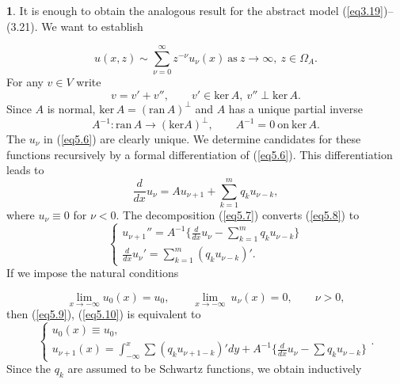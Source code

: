 \documentclass{surv-l}
\theoremstyle{plain}
\theoremstyle{definition}
\newtheorem*{pf}{\sc{Proof}}
\numberwithin{equation}{chapter}
\begin{document}
\begin{pf}
It is enough to obtain the analogous result for the abstract model (\ref{eq3.19})--(3.21). We want to establish

\begin{equation}\label{eq5.6}
u(x,z)\sim\sum_{\nu=0}^{\infty}z^{-\nu}u_{\nu}(x)\ \mathrm{as}\  z\rightarrow\infty,\ z\in\Omega_{A}.
\end{equation}
For any $v\in V$ write
\begin{equation}\label{eq5.7}
v=v'+v'',\qquad v'\in \mathrm{ker}\,A,\ v''\perp \mathrm{ker}\,A.
\end{equation}
Since $A$ is normal, $\mathrm{ker}\,A= (\mathrm{ran}\,A)^{\perp}$ and $A$ has a unique partial inverse
\begin{equation*}
A^{-1} : \mathrm{ran}\, A\rightarrow(\mathrm{ker}A)^{\perp},\qquad A^{-1}=0\ \mathrm{on}\ \mathrm{ker}\,A.
\end{equation*}
The $u_{\nu}$ in (\ref{eq5.6}) are clearly unique. We determine candidates for these functions recursively by a formal differentiation of (\ref{eq5.6}). This differentiation leads to
\begin{equation}\label{eq5.8}
\frac{d}{dx}u_{\nu}=Au_{\nu+1}+\sum_{k=1}^{m}q_{k}u_{\nu-k},
\end{equation}
where $u_{\nu}\equiv 0$ for $\nu <0$. The decomposition (\ref{eq5.7}) converts (\ref{eq5.8}) to
\begin{equation}\label{eq5.9}
\left\{\begin{array}{l}
u_{\nu+1}''=A^{-1}\{\frac{d}{dx}u_{\nu}-\sum_{k=1}^{m}q_{k}u_{\nu-k}\}\\
\frac{d}{dx}u_{\nu}'=\sum_{k=1}^{m}(q_{k}u_{\nu-k})'.
\end{array}\right.
\end{equation}
If we impose the natural conditions

\begin{equation}\label{eq5.10}
\lim_{x\rightarrow-\infty} u_{0}(x)=u_{0},\qquad \lim_{x\rightarrow-\infty}\ u_{\nu}(x)=0,\qquad \nu >0,
\end{equation}
then (\ref{eq5.9}), (\ref{eq5.10}) is equivalent to
\begin{equation}\label{eq5.11}
\left\{\begin{array}{l}
u_{0}(x)\equiv u_{0},\\
u_{\nu+1}(x)=\int_{-\infty}^{x}\sum(q_{k}u_{\nu+1-k})'dy+A^{-1}\{\frac{d}{dx}u_{\nu}-\sum q_{k}u_{\nu-k}\}
\end{array}\right..
\end{equation}
Since the $q_{k}$ are assumed to be Schwartz functions, we obtain inductively


\end{pf}
\end{document}
